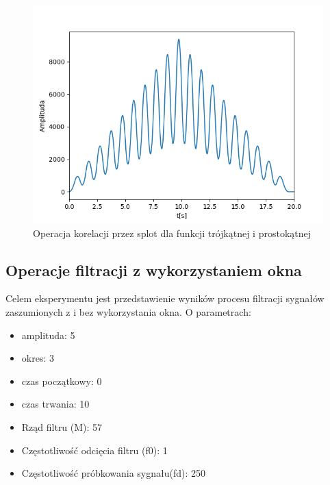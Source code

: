 \documentclass[12pt]{article}
\begin{document}
\begin{figure}[H]
\centering
\includegraphics[scale=0.6]{korelacjaSplotTrojkatProstokat.png}
\caption{Operacja korelacji przez splot dla funkcji trójkątnej i prostokątnej}
\end{figure}

\subsection{Operacje filtracji z wykorzystaniem okna}
Celem eksperymentu jest przedstawienie wyników procesu filtracji sygnałów zaszumionych z i bez wykorzystania okna. O parametrach:
\begin{itemize}
\item amplituda: 5
\item okres: 3
\item czas początkowy: 0
\item czas trwania: 10
\end{itemize}

\begin{itemize}
\item Rząd filtru (M): 57
\item Częstotliwość odcięcia filtru (f0): 1
\item Częstotliwość próbkowania sygnału(fd): 250
\end{itemize}
\end{document}
